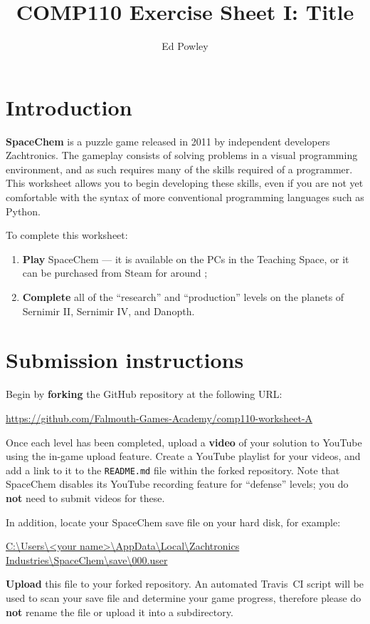 \documentclass{../../../fal_assignment}
\title{COMP110 Exercise Sheet I: Title}
\author{Ed Powley}
\begin{document}
\maketitle

\section*{Introduction}

\textbf{SpaceChem} is a puzzle game released in 2011 by independent developers Zachtronics. The gameplay consists of solving problems in a visual programming environment, and as such requires many of the skills required of a programmer. This worksheet allows you to begin developing these skills, even if you are not yet comfortable with the syntax of more conventional programming languages such as Python.

To complete this worksheet:
\begin{enumerate}[label=(\alph*)]
	\item \textbf{Play} SpaceChem --- it is available on the PCs in the Teaching Space,
		or it can be purchased from Steam for around ;
 	\item \textbf{Complete} all of the ``research'' and ``production'' levels on the planets of Sernimir II, Sernimir IV, and Danopth.
\end{enumerate}

\section*{Submission instructions}

Begin by \textbf{forking} the GitHub repository at the following URL:

\url{https://github.com/Falmouth-Games-Academy/comp110-worksheet-A}

Once each level has been completed, upload a \textbf{video} of your solution to YouTube using the in-game upload feature.
Create a YouTube playlist for your videos, and add a link to it to the \texttt{README.md} file within the forked repository.
Note that SpaceChem disables its YouTube recording feature for ``defense'' levels; you do \textbf{not} need to submit videos for these.

In addition, locate your SpaceChem save file on your hard disk, for example:

\url{C:\Users\<your name>\AppData\Local\Zachtronics Industries\SpaceChem\save\000.user}

\textbf{Upload} this file to your forked repository.
An automated Travis~CI script will be used to scan your save file and determine your game progress,
therefore please do \textbf{not} rename the file or upload it into a subdirectory.
\end{document}
